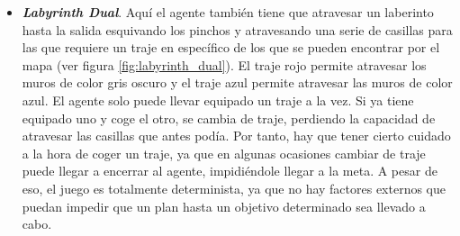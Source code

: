\begin{itemize}[label=\textbullet]
    \item \textbf{\textit{Labyrinth Dual}}. Aquí el agente también tiene que atravesar un laberinto
    hasta la salida esquivando los pinchos y atravesando una serie de casillas para las que requiere
    un traje en específico de los que se pueden encontrar por el mapa (ver figura \ref{fig:labyrinth_dual}).
    El traje rojo permite atravesar los muros de color gris oscuro y el traje azul permite atravesar
    las muros de color azul. El agente solo puede llevar equipado un traje a la vez. Si ya tiene equipado
    uno y coge el otro, se cambia de traje, perdiendo la capacidad de atravesar las casillas que
    antes podía. Por tanto, hay que tener cierto cuidado a la hora de coger un traje, ya que
    en algunas ocasiones cambiar de traje puede llegar a encerrar al agente, impidiéndole llegar
    a la meta. A pesar de eso, el juego es totalmente determinista, ya que no hay factores
    externos que puedan impedir que un plan hasta un objetivo determinado sea llevado a cabo.
\end{itemize}

